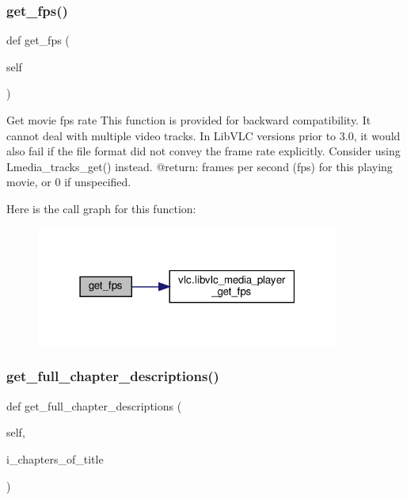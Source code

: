 \subsubsection{\texorpdfstring{get\+\_\+fps()}{get\_fps()}}
{\footnotesize\ttfamily def get\+\_\+fps (\begin{DoxyParamCaption}\item[{}]{self }\end{DoxyParamCaption})}

\begin{DoxyVerb}Get movie fps rate
This function is provided for backward compatibility. It cannot deal with
multiple video tracks. In LibVLC versions prior to 3.0, it would also fail
if the file format did not convey the frame rate explicitly.
\deprecated Consider using L{media_tracks_get}() instead.
@return: frames per second (fps) for this playing movie, or 0 if unspecified.
\end{DoxyVerb}
 Here is the call graph for this function\+:
\nopagebreak
\begin{figure}[H]
\begin{center}
\leavevmode
\includegraphics[width=283pt]{classvlc_1_1_media_player_a823cac8c86fef8482ec276c7988e0154_cgraph}
\end{center}
\end{figure}
\mbox{\label{classvlc_1_1_media_player_a8c7d9546a94507e0046488e6159d8ffc}} 
\subsubsection{\texorpdfstring{get\+\_\+full\+\_\+chapter\+\_\+descriptions()}{get\_full\_chapter\_descriptions()}}
{\footnotesize\ttfamily def get\+\_\+full\+\_\+chapter\+\_\+descriptions (\begin{DoxyParamCaption}\item[{}]{self,  }\item[{}]{i\+\_\+chapters\+\_\+of\+\_\+title }\end{DoxyParamCaption})}

